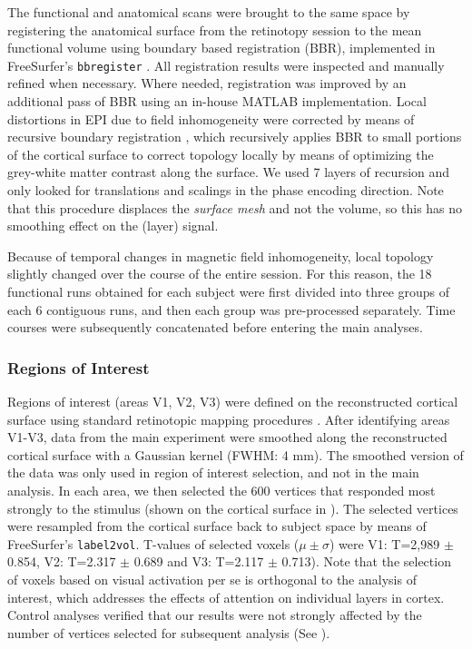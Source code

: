 \documentclass[9pt,lineno]{aperture}
\begin{document}
The functional and anatomical scans were brought to the same space by registering the anatomical surface from the retinotopy session to the mean functional volume using boundary based registration (BBR), implemented in FreeSurfer's \texttt{bbregister} \citep{Greve2009}. All registration results were inspected and manually refined when necessary. Where needed, registration was improved by an additional pass of BBR using an in-house MATLAB implementation. Local distortions in EPI due to field inhomogeneity were corrected by means of recursive boundary registration \citep{VanMourik2019}, which recursively applies BBR to small portions of the cortical surface to correct topology locally by means of optimizing the grey-white matter contrast along the surface. We used 7 layers of recursion and only looked for translations and scalings in the phase encoding direction. Note that this procedure displaces the \textit{surface mesh} and not the volume, so this has no smoothing effect on the (layer) signal. 

Because of temporal changes in magnetic field inhomogeneity, local topology slightly changed over the course of the entire session. For this reason, the 18 functional runs obtained for each subject were first divided into three groups of each 6 contiguous runs, and then each group was pre-processed separately. Time courses were subsequently concatenated before entering the main analyses.

\subsubsection{Regions of Interest}
Regions of interest (areas V1, V2, V3) were defined on the reconstructed cortical surface using standard retinotopic mapping procedures \citep{Sereno1995,DeYoe1996,Engel1997}. After identifying areas V1-V3, data from the main experiment were smoothed along the reconstructed cortical surface with a Gaussian kernel (FWHM: 4 mm). The smoothed version of the data was only used in region of interest selection, and not in the main analysis. In each area, we then selected the 600 vertices that responded most strongly to the stimulus (shown on the cortical surface in ). The selected vertices were resampled from the cortical surface back to subject space by means of FreeSurfer's \texttt{label2vol}. T-values of selected voxels ($\mu \pm \sigma$) were V1: T=2,989 $\pm$ 0.854, V2: T=2.317 $\pm$ 0.689 and V3: T=2.117 $\pm$ 0.713). Note that the selection of voxels based on visual activation per se is orthogonal to the analysis of interest, which addresses the effects of attention on individual layers in cortex. Control analyses verified that our results were not strongly affected by the number of vertices selected for subsequent analysis (See ).
\end{document}
